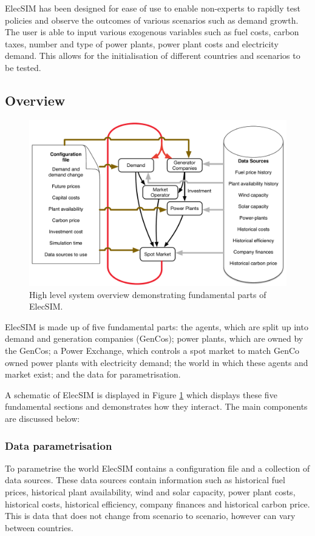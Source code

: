 
ElecSIM has been designed for ease of use to enable non-experts to rapidly test policies and observe the outcomes of various scenarios such as demand growth. The user is able to input various exogenous variables {\color{red}such as fuel costs, carbon taxes, number and type of power plants, power plant costs and electricity demand.} This allows for the initialisation of different countries and scenarios to be tested.


\subsection{Overview}

\begin{figure}
	\centering
	\includegraphics[width=0.97\linewidth]{figures/System_overview}
	\caption{High level system overview demonstrating fundamental parts of ElecSIM.}
	\label{fig:systemoverview}
\end{figure}




ElecSIM is made up of five fundamental parts: the agents, which are split up into demand and generation companies (GenCos); power plants, which are owned by the GenCos; a Power Exchange, which controls a spot market to match GenCo owned power plants with electricity demand; the world in which these agents and market exist; and the data for parametrisation.

A schematic of ElecSIM is displayed in Figure \ref{fig:systemoverview} which displays these five fundamental sections and demonstrates how they interact. The main components are discussed below:

\subsubsection{Data parametrisation} To parametrise the world ElecSIM contains a configuration file and a collection of data sources. These data sources contain information such as historical fuel prices, historical plant availability, wind and solar capacity, power plant costs, historical costs, historical efficiency, company finances and historical carbon price. {\color{red} This is data that does not change from scenario to scenario, however can vary between countries.}

